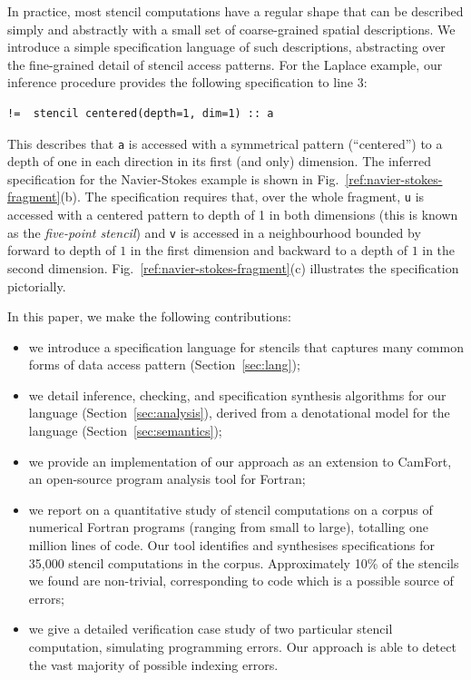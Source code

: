 \documentclass[9pt,preprint]{sigplanconf}
\theoremstyle{definition}
\begin{document}
In practice, most stencil computations have a regular shape that can
be described simply and abstractly with a small set of coarse-grained
spatial descriptions. We introduce a simple specification language of
such descriptions, abstracting over the fine-grained detail of stencil
access patterns. For the Laplace example, our
inference procedure provides the following specification to line 3:
%
\begin{verbatim}
!=  stencil centered(depth=1, dim=1) :: a
\end{verbatim}
%
This describes that \texttt{a} is accessed with a
symmetrical pattern (``centered'') to a depth of one in each
direction in its first (and only) dimension.
The inferred specification for the Navier-Stokes example is shown 
in Fig.~\ref{ref:navier-stokes-fragment}(b). The
specification requires that, over the whole fragment, \texttt{u} is
accessed with a centered pattern to depth of 1 in both dimensions
(this is known as the \emph{five-point stencil}) and \texttt{v}
is accessed in a neighbourhood bounded by forward to depth of $1$ in
the first dimension and backward to a depth of $1$ in the second
dimension. Fig.~\ref{ref:navier-stokes-fragment}(c) illustrates
the specification pictorially.

In this paper, we make the following contributions:
%
\begin{itemize}[leftmargin=0.8em]
\item we introduce a specification language for stencils 
  that captures many common forms of data access pattern
  (Section~\ref{sec:lang}); 

\item we detail inference, checking, and specification synthesis 
algorithms for our language (Section~\ref{sec:analysis}), derived from
a denotational model for the language (Section~\ref{sec:semantics});

\item we provide an implementation of our approach as an extension to
  CamFort, an open-source program analysis tool for Fortran;
  
\item we report on a quantitative study of
  stencil computations on a corpus of numerical Fortran programs
  (ranging from small to large),  totalling one million lines of code. Our tool identifies and
  synthesises specifications for 35,000 stencil computations in the
  corpus. Approximately 10\% of the stencils we found are non-trivial,
  corresponding to code which is a possible source of errors;

\item we give a detailed verification case study of two
  particular stencil computation, simulating programming errors.
  Our approach is able to detect the vast majority of possible
  indexing errors.
\end{itemize}
%
\end{document}
